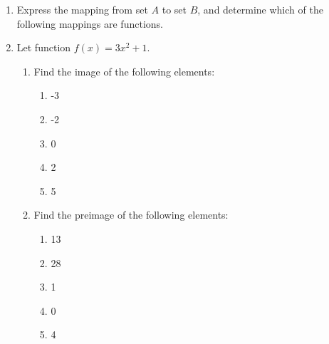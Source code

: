 \documentclass{report}
\begin{document}
\begin{enumerate}
  \item Express the mapping from set $A$ to set $B$, and determine which of the
        following mappings are functions.


  \item Let function $f(x) = 3x^2 + 1$.
        \begin{enumerate}
          \item Find the image of the following elements:
                \begin{enumerate}
                  \item -3
                  \item -2
                  \item 0
                  \item 2
                  \item 5
                \end{enumerate}
          \item Find the preimage of the following elements:
                \begin{enumerate}
                  \item 13
                  \item 28
                  \item 1
                  \item 0
                  \item 4
                \end{enumerate}
        \end{enumerate}


\end{enumerate}
\end{document}
